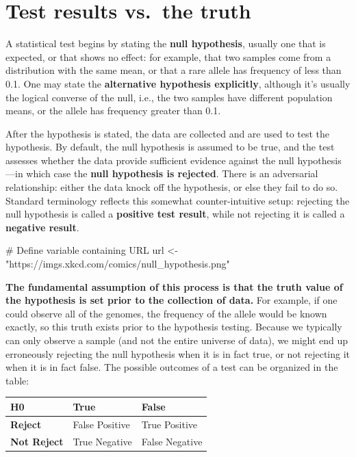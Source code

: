\documentclass[
  letterpaper,
  DIV=11,
  numbers=noendperiod]{scrreprt}
\newenvironment{Shaded}{\begin{snugshade}}{\end{snugshade}}
\newcommand{\NormalTok}[1]{\textcolor[rgb]{0.00,0.23,0.31}{#1}}
\begin{document}
\section{Test results vs.~the truth}\label{test-results-vs.-the-truth}

A statistical test begins by stating the \textbf{null hypothesis},
usually one that is expected, or that shows no effect: for example, that
two samples come from a distribution with the same mean, or that a rare
allele has frequency of less than 0.1. One may state the
\textbf{alternative hypothesis explicitly}, although it's usually the
logical converse of the null, i.e., the two samples have different
population means, or the allele has frequency greater than 0.1.

After the hypothesis is stated, the data are collected and are used to
test the hypothesis. By default, the null hypothesis is assumed to be
true, and the test assesses whether the data provide sufficient evidence
against the null hypothesis---in which case the \textbf{null hypothesis
is rejected}. There is an adversarial relationship: either the data
knock off the hypothesis, or else they fail to do so. Standard
terminology reflects this somewhat counter-intuitive setup: rejecting
the null hypothesis is called a \textbf{positive test result}, while not
rejecting it is called a \textbf{negative result}.

\begin{Shaded}
\begin{Highlighting}[]
\NormalTok{\# Define variable containing URL}
\NormalTok{url \textless{}{-} "https://imgs.xkcd.com/comics/null\_hypothesis.png"}
\end{Highlighting}
\end{Shaded}

\textbf{The fundamental assumption of this process is that the truth
value of the hypothesis is set prior to the collection of data.} For
example, if one could observe all of the genomes, the frequency of the
allele would be known exactly, so this truth exists prior to the
hypothesis testing. Because we typically can only observe a sample (and
not the entire universe of data), we might end up erroneously rejecting
the null hypothesis when it is in fact true, or not rejecting it when it
is in fact false. The possible outcomes of a test can be organized in
the table:

\begin{longtable}[]{@{}lll@{}}
\toprule\noalign{}
H0 & True & False \\
\midrule\noalign{}
\endhead
\bottomrule\noalign{}
\endlastfoot
\textbf{Reject} & False Positive & True Positive \\
\textbf{Not Reject} & True Negative & False Negative \\
\end{longtable}
\end{document}
